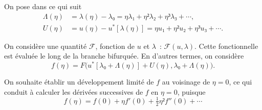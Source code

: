 \documentclass[12pt, final]{amsart}
\begin{document}
On pose dans ce qui suit
\begin{align}
  \label{eq:20211112155446}
  Λ(η)&=λ(η)-λ₀=ηλ₁+η²λ₂+η³λ₃+\cdots,\\
  \label{eq:20211112113028}
  U(η)&=u(η)-u^*[λ(η)]=ηu₁+η²u₂+η³u₃+\cdots.
\end{align}

On considère une quantité \(ℱ\), fonction de \(u\) et \(λ\)~: \(ℱ(u,
λ)\). Cette fonctionnelle est évaluée le long de la branche bifurquée. En
d'autres termes, on considère
\begin{equation}
  f(η)=F\bigl(u^*[λ₀+Λ(η)]+U(η), λ₀+Λ(η)\bigr).
\end{equation}

On souhaite établir un développement limité de \(f\) au voisinage de \(η=0\),
ce qui conduit à calculer les dérivées successives de \(f\) en \(η=0\), puisque
\begin{equation}
  f(η)=f(0)+η f'(0)+\tfrac12η²f''(0)+\cdots
\end{equation}
\end{document}
